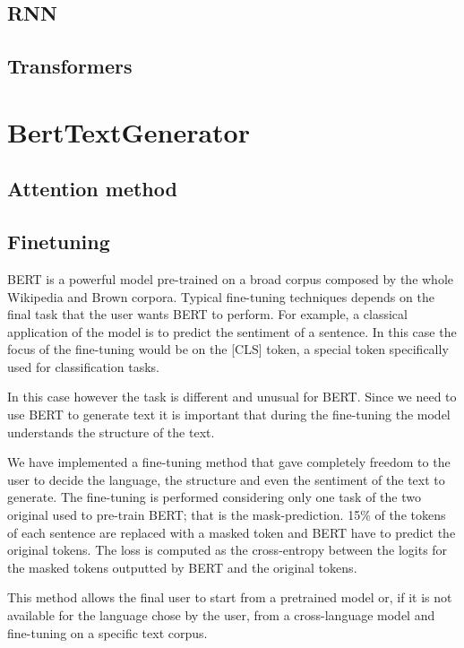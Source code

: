 \documentclass[10pt,twocolumn,letterpaper]{article}
\begin{document}
\subsection{RNN}

\subsection{Transformers}


\section{BertTextGenerator}


\subsection{Attention method}


\subsection{Finetuning}
BERT is a powerful model pre-trained on a broad corpus composed by the whole
Wikipedia and Brown corpora.
Typical fine-tuning techniques depends on the final task that the user wants BERT to perform.
For example, a classical application of the model is to predict the sentiment of a sentence.
In this case the focus of the fine-tuning would be on the [CLS] token,
a special token specifically used for classification tasks.

In this case however the task is different and unusual for BERT.
Since we need to use BERT to generate text it is important that during the
fine-tuning the model understands the structure of the text.

We have implemented a fine-tuning method that gave completely freedom to the user to decide the language,
the structure and even the sentiment of the text to generate.
The fine-tuning is performed considering only one task of the
two original used to pre-train BERT; that is the mask-prediction.
15\% of the tokens of each sentence are replaced with a masked token and
BERT have to predict the original tokens.
The loss is computed as the cross-entropy between the logits for the
masked tokens outputted by BERT and the original tokens.

This method allows the final user to start from a pretrained model or, if
it is not available for the language chose by the user, from a cross-language model
and fine-tuning on a specific text corpus.
\end{document}
